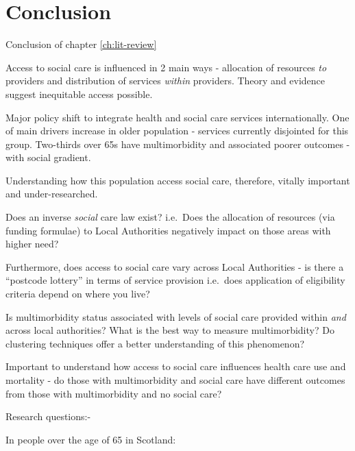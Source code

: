 \documentclass[12pt,]{report}
\begin{document}
\section{Conclusion}\label{sec:lit-review-conclusion}

Conclusion of chapter \ref{ch:lit-review}

Access to social care is influenced in 2 main ways - allocation of
resources \emph{to} providers and distribution of services \emph{within}
providers. Theory and evidence suggest inequitable access possible.

Major policy shift to integrate health and social care services
internationally. One of main drivers increase in older population -
services currently disjointed for this group. Two-thirds over 65s have
multimorbidity and associated poorer outcomes - with social gradient.

Understanding how this population access social care, therefore, vitally
important and under-researched.

Does an inverse \emph{social} care law exist? i.e.~Does the allocation
of resources (via funding formulae) to Local Authorities negatively
impact on those areas with higher need?

Furthermore, does access to social care vary across Local Authorities -
is there a ``postcode lottery'' in terms of service provision i.e.~does
application of eligibility criteria depend on where you live?

Is multimorbidity status associated with levels of social care provided
within \emph{and} across local authorities? What is the best way to
measure multimorbidity? Do clustering techniques offer a better
understanding of this phenomenon?

Important to understand how access to social care influences health care
use and mortality - do those with multimorbidity and social care have
different outcomes from those with multimorbidity and no social care?

Research questions:-

In people over the age of 65 in Scotland:
\end{document}
